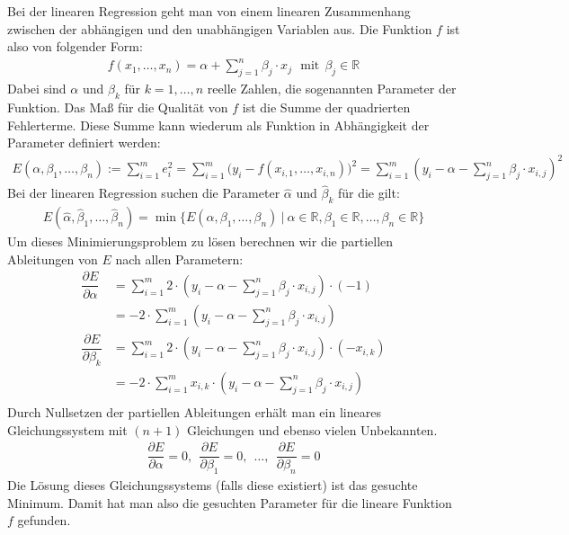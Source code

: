 Bei der linearen Regression geht man von einem linearen Zusammenhang zwischen der abhängigen und den unabhängigen Variablen aus. Die Funktion $f$ ist also von folgender Form:
\begin{align*}
    f(x_1, \dots, x_n) = \alpha + \sum_{j=1}^n \beta_j \cdot x_j ~~~ \text{mit} ~~ \beta_j \in \mathbb{R}
\end{align*}
Dabei sind $\alpha$ und $\beta_k$ für $k = 1, \dots, n$ reelle Zahlen, die sogenannten Parameter der Funktion. Das Maß für die Qualität von $f$ ist die Summe der quadrierten Fehlerterme. Diese Summe kann wiederum als Funktion in Abhängigkeit der Parameter definiert werden:
\begin{align*}
    E \left( \alpha, \beta_1, \dots, \beta_n \right) := \sum_{i=1}^m e_i^2 =  \sum_{i=1}^m \big( y_i - f(x_{i, 1}, \dots, x_{i, n}) \big)^2 = \sum_{i=1}^m \left( y_i - \alpha - \sum_{j=1}^n \beta_j \cdot x_{i, j} \right)^2
\end{align*}
Bei der linearen Regression suchen die Parameter $\hat\alpha$ und $\hat\beta_k$ für die gilt:
\begin{align*}
    E \left( \hat\alpha, \hat\beta_1, \dots, \hat\beta_n \right) = \min \big\{E(\alpha, \beta_1, \dots, \beta_n) ~\big|~ \alpha \in \mathbb{R}, \beta_1 \in \mathbb{R}, \dots, \beta_n \in \mathbb{R} \big\}
\end{align*}
Um dieses Minimierungsproblem zu lösen berechnen wir die partiellen Ableitungen von $E$ nach allen Parametern:
\begin{align*}
    \dfrac{\partial E}{\partial \alpha} &= \sum_{i=1}^m 2 \cdot \left( y_i - \alpha - \sum_{j=1}^n \beta_j \cdot x_{i, j} \right) \cdot (- 1) \\
    &= - 2 \cdot \sum_{i=1}^m \left( y_i - \alpha - \sum_{j=1}^n \beta_j \cdot x_{i, j} \right) \\
    \dfrac{\partial E}{\partial \beta_k} &= \sum_{i=1}^m 2 \cdot \left( y_i - \alpha - \sum_{j=1}^n \beta_j \cdot x_{i, j} \right) \cdot (- x_{i, k}) \\
    &= - 2 \cdot \sum_{i=1}^m x_{i, k} \cdot \left( y_i - \alpha - \sum_{j=1}^n \beta_j \cdot x_{i, j} \right) \\
\end{align*}
Durch Nullsetzen der partiellen Ableitungen erhält man ein lineares Gleichungssystem mit $(n + 1)$ Gleichungen und ebenso vielen Unbekannten.
\begin{align*}
    \dfrac{\partial E}{\partial \alpha} = 0, ~~ \dfrac{\partial E}{\partial \beta_1} = 0, ~~ \dots, ~~ \dfrac{\partial E}{\partial \beta_n} = 0
\end{align*}
Die Lösung dieses Gleichungssystems (falls diese existiert) ist das gesuchte Minimum. Damit hat man also die gesuchten Parameter für die lineare Funktion $f$ gefunden.

